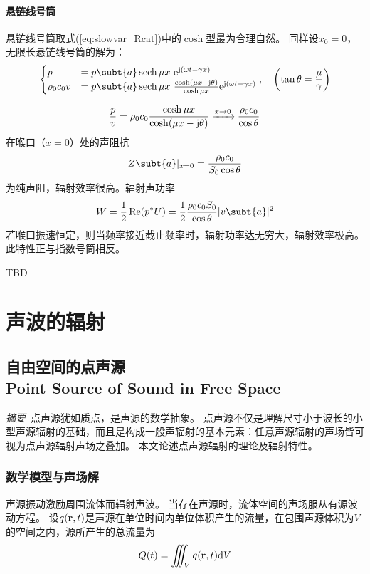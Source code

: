 \documentclass[UTF8]{ctexbook}
\begin{document}
\subsubsection{悬链线号筒}
悬链线号筒取式(\ref{eq:slowvar_Rcat})中的$\cosh$型最为合理自然。
同样设$x_0=0$，无限长悬链线号筒的解为：
\begin{equation}
	\begin{cases}
	p&=p\subt{a}\sech \mu x \ \me^{\mj (\omega t-\gamma x)}\\
	\rho_0 c_0 v & = p\subt{a} \sech \mu x\ \frac{
	\cosh (\mu x-\mj \theta)}{\cosh \mu x} \me^{\mj(\omega t-\gamma x)}
	\end{cases}
	\qc 
	\qty(\tan \theta = \frac{\mu}{\gamma })
\end{equation}

\begin{equation}
	\frac{p}{v} = \rho_0c_0 \frac{\cosh \mu x}{\cosh (\mu x-\mathrm{j} \theta)}
	\xrightarrow{x\to 0} \frac{\rho_0c_0}{\cos\theta}
\end{equation}
在喉口（$x=0$）处的声阻抗
$$Z\subt{a}|_{x=0} = \frac{\rho_0c_0}{S_0\cos\theta}$$
为纯声阻，辐射效率很高。辐射声功率
$$W = \frac12 \Re (p^*U) = \frac{1}{2}\frac{\rho_0c_0S_0}{\cos\theta}
|v\subt{a}|^2$$
若喉口振速恒定，则当频率接近截止频率时，辐射功率达无穷大，辐射效率极高。
此特性正与指数号筒相反。

TBD

\chapter{声波的辐射}

\section{自由空间的点声源\\
Point Source of Sound in Free Space}

\emph{摘要}\
点声源犹如质点，是声源的数学抽象。
点声源不仅是理解尺寸小于波长的小型声源辐射的基础，而且是构成一般声辐射的基本元素：任意声源辐射的声场皆可视为点声源辐射声场之叠加。
本文论述点声源辐射的理论及辐射特性。

\subsection{数学模型与声场解}
声源振动激励周围流体而辐射声波。
当存在声源时，流体空间的声场服从有源波动方程。
设$q(\vb{r},t)$是声源在单位时间内单位体积产生的流量，在包围声源体积为$V$的空间之内，源所产生的总流量为
$$
Q(t) = \iiint_V q(\vb{r},t)\dd V
$$
\end{document}
